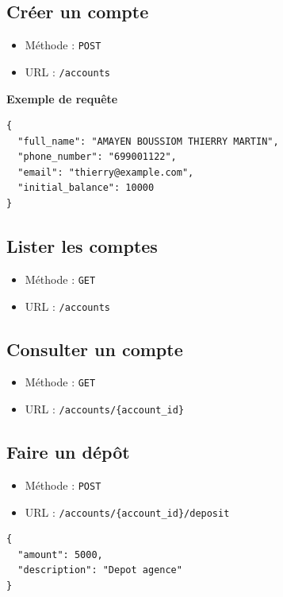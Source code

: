 \documentclass[12pt,a4paper]{article}
\begin{document}
\subsection{Créer un compte}

\begin{itemize}
    \item Méthode : \texttt{POST}
    \item URL : \texttt{/accounts}
\end{itemize}

\textbf{Exemple de requête}

\begin{verbatim}
{
  "full_name": "AMAYEN BOUSSIOM THIERRY MARTIN",
  "phone_number": "699001122",
  "email": "thierry@example.com",
  "initial_balance": 10000
}
\end{verbatim}

\subsection{Lister les comptes}

\begin{itemize}
    \item Méthode : \texttt{GET}
    \item URL : \texttt{/accounts}
\end{itemize}

\subsection{Consulter un compte}

\begin{itemize}
    \item Méthode : \texttt{GET}
    \item URL : \texttt{/accounts/\{account\_id\}}
\end{itemize}

\subsection{Faire un dépôt}

\begin{itemize}
    \item Méthode : \texttt{POST}
    \item URL : \texttt{/accounts/\{account\_id\}/deposit}
\end{itemize}

\begin{verbatim}
{
  "amount": 5000,
  "description": "Depot agence"
}
\end{verbatim}
\end{document}
